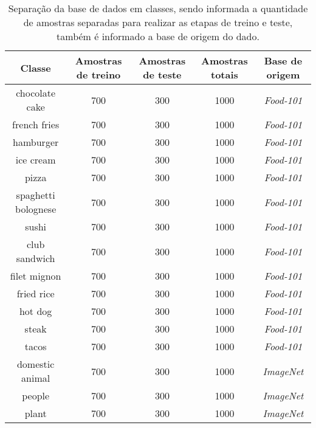 \begin{table}[H]
    \centering
    \caption[Disposição da base de dados]{Separação da base de dados em classes, sendo informada a quantidade de amostras separadas para realizar as etapas de treino e teste, também é informado a base de origem do dado.
    \label{tab:base_images}}
    \begin{tabular}{ccccc}
        \toprule
             Classe & Amostras de treino & Amostras de teste & Amostras totais & Base de origem \\
        \midrule
            chocolate cake & 700 & 300 & 1000 & \textit{Food-101}\\
            french fries & 700 & 300 & 1000 & \textit{Food-101}\\
            hamburger & 700 & 300 & 1000 & \textit{Food-101}\\
            ice cream & 700 & 300 & 1000 & \textit{Food-101}\\
            pizza & 700 & 300 & 1000 & \textit{Food-101}\\
            spaghetti bolognese & 700 & 300 & 1000 & \textit{Food-101}\\
            sushi & 700 & 300 & 1000 & \textit{Food-101}\\
            club sandwich & 700 & 300 & 1000 & \textit{Food-101}\\
            filet mignon & 700 & 300 & 1000 & \textit{Food-101}\\
            fried rice & 700 & 300 & 1000 & \textit{Food-101}\\
            hot dog & 700 & 300 & 1000 & \textit{Food-101}\\
            steak & 700 & 300 & 1000 & \textit{Food-101}\\
            tacos & 700 & 300 & 1000 & \textit{Food-101}\\
            domestic animal & 700 & 300 & 1000 & \textit{ImageNet}\\
            people & 700 & 300 & 1000 & \textit{ImageNet}\\
            plant & 700 & 300 & 1000 & \textit{ImageNet}\\

        \bottomrule
    \end{tabular}
\end{table}
